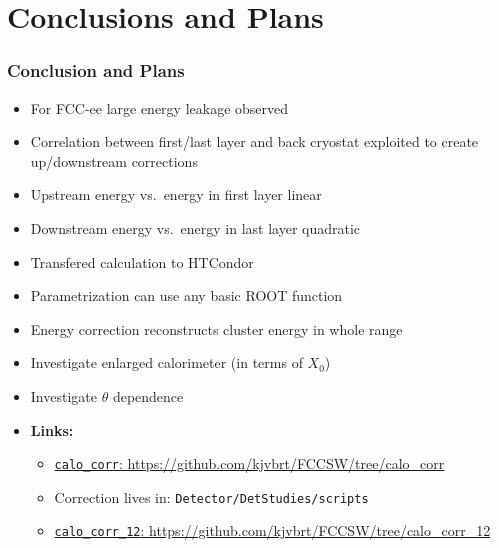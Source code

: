 \documentclass[aspectratio=169]{beamer}
\newcommand{\backupbegin}{%
   \newcounter{finalframe}
   \setcounter{finalframe}{\value{framenumber}}
}
\newcommand{\backupend}{%
   \setcounter{framenumber}{\value{finalframe}}
}
\newcommand{\bluetext}[1]{%
  \textcolor{myBlue}{#1}
}
\newcommand{\redtext}[1]{%
  \textcolor{myRed}{#1}
}
\begin{document}
\section{Conclusions and Plans}

\begin{frame}
  \frametitle{Conclusion and Plans}

  \begin{itemize}
    \item For FCC-ee large energy leakage observed
    \item Correlation between first/last layer and back cryostat exploited to create
          up/downstream corrections
    \item \redtext{Upstream} energy vs.\ energy in first layer \redtext{linear}
    \item \redtext{Downstream} energy vs.\ energy in last layer
          \redtext{quadratic}
    \item Transfered calculation to HTCondor
    \item Parametrization can use any basic ROOT function
    \item Energy correction reconstructs cluster energy in whole range
    \item Investigate enlarged calorimeter (in terms of $X_{0}$)
    \item Investigate $\theta$ dependence
    \item \bluetext{\bf Links:}
          \begin{itemize}
            \item \href{https://github.com/kjvbrt/FCCSW/tree/calo_corr}
                  {\footnotesize \bluetext{\texttt{calo\_corr}: https://github.com/kjvbrt/FCCSW/tree/calo\_corr}}
            \item {\footnotesize \bluetext{Correction lives in: \texttt{Detector/DetStudies/scripts}}}
            \item \href{https://github.com/kjvbrt/FCCSW/tree/calo_corr_12}
                  {\scriptsize \bluetext{\texttt{calo\_corr\_12}: https://github.com/kjvbrt/FCCSW/tree/calo\_corr\_12}}
          \end{itemize}
  \end{itemize}
\end{frame}


%
%
\end{document}
